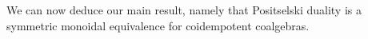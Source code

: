 


We can now deduce our main result, namely that Positselski duality is a symmetric monoidal equivalence for coidempotent coalgebras. 

